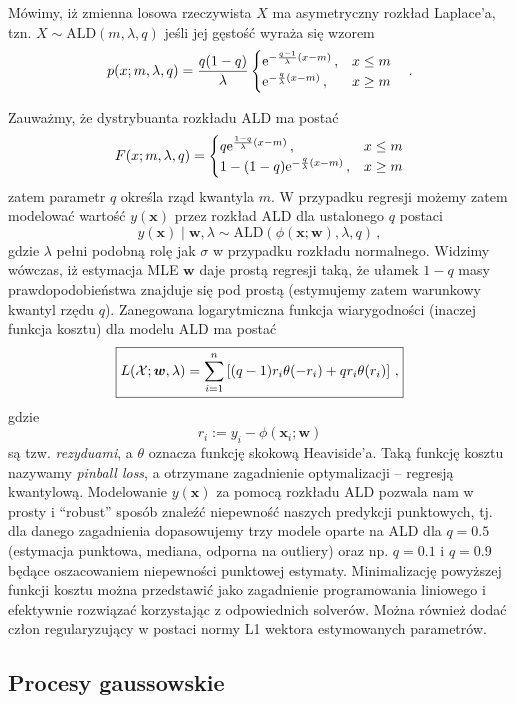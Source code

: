 \documentclass{myclass}
\numberwithin{equation}{subsection}
\begin{document}
\begin{definition}
Mówimy, iż zmienna losowa rzeczywista \(X\) ma asymetryczny rozkład Laplace'a, tzn. \(X \sim
\mathrm{ALD}(m, \lambda, q)\) jeśli jej gęstość wyraża się wzorem
\[
p(x; m,\lambda,q) = \frac{q(1-q)}{\lambda}\begin{cases}
    \mathrm{e}^{-\frac{q-1}{\lambda} (x - m)}\,,&x \leq m\\
    \mathrm{e}^{-\frac{q}{\lambda} (x - m)}\,,&x \geq m
\end{cases}\quad.
\]
\end{definition}
Zauważmy, że dystrybuanta rozkładu ALD ma postać
\[
F(x; m,\lambda,q) = \begin{cases}
    q \mathrm{e}^{\frac{1-q}{\lambda}(x - m)}\,,&x \leq m\\
    1 - (1-q)\mathrm{e}^{-\frac{q}{\lambda}(x - m)}\,,&x \geq m
\end{cases}
\]
zatem parametr \(q\) określa rząd kwantyla \(m\). W przypadku regresji możemy zatem modelować
wartość \(y(\bm{x})\) przez rozkład ALD dla ustalonego \(q\) postaci
\[
y(\bm{x}) \mid \bm{w}, \lambda \sim \mathrm{ALD}(\phi(\bm{x}; \bm{w}), \lambda, q)\,,
\]
gdzie \(\lambda\) pełni podobną rolę jak \(\sigma\) w przypadku rozkładu normalnego. Widzimy
wówczas, iż estymacja MLE \(\bm{w}\) daje prostą regresji taką, że ułamek \(1-q\) masy
prawdopodobieństwa znajduje się pod prostą (estymujemy zatem warunkowy kwantyl rzędu \(q\)).
Zanegowana logarytmiczna funkcja wiarygodności (inaczej funkcja kosztu) dla modelu ALD ma postać
\[
\boxed{
L(\mathcal{X}; \bm{w}, \lambda) = \sum_{i=1}^n \left[(q-1) r_i \theta(-r_i) + q r_i \theta(r_i)\right]\,,
}
\]
gdzie
\[
r_i := y_i - \phi(\bm{x}_i;\bm{w})
\]
są tzw. \emph{rezyduami}, a \(\theta\) oznacza funkcję skokową Heaviside'a. Taką funkcję kosztu
nazywamy \emph{pinball loss}, a otrzymane zagadnienie optymalizacji -- regresją kwantylową.
Modelowanie \(y(\bm{x})\) za pomocą rozkładu ALD pozwala nam w prosty i \enquote{robust} sposób
znaleźć niepewność naszych predykcji punktowych, tj. dla danego zagadnienia dopasowujemy trzy modele
oparte na ALD dla \(q = 0.5\) (estymacja punktowa, mediana, odporna na outliery) oraz np. \(q =
0.1\) i \(q = 0.9\) będące oszacowaniem niepewności punktowej estymaty. Minimalizację powyższej
funkcji kosztu można przedstawić jako zagadnienie programowania liniowego i efektywnie rozwiązać
korzystając z odpowiednich solverów. Można również dodać człon regularyzujący w postaci normy L1
wektora estymowanych parametrów.


\subsection{Procesy gaussowskie}
\end{document}

